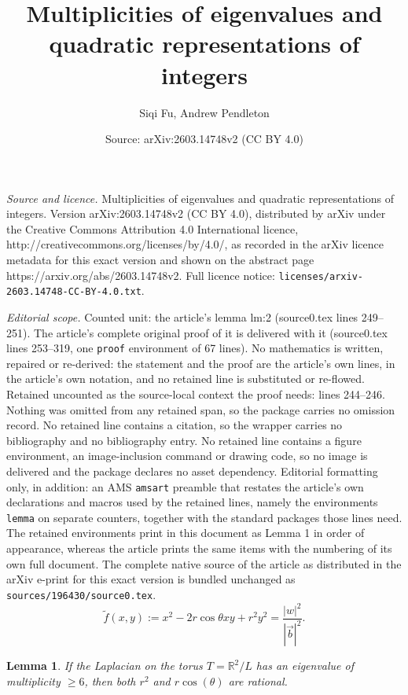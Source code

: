 \documentclass[10pt,a4paper]{amsart}
\title{Multiplicities of eigenvalues and quadratic representations of integers}
\author{Siqi Fu, Andrew Pendleton}
\date{Source: arXiv:2603.14748v2 (CC BY 4.0)}
\newtheorem{lemma}{Lemma}
\def\R{{\mathbb R}}
\begin{document}
\maketitle

\noindent\emph{Source and licence.} Multiplicities of eigenvalues and quadratic representations of integers. Version arXiv:2603.14748v2 (CC BY 4.0), distributed by arXiv under the Creative Commons Attribution 4.0 International licence, http://creativecommons.org/licenses/by/4.0/, as recorded in the arXiv licence metadata for this exact version and shown on the abstract page https://arxiv.org/abs/2603.14748v2. Full licence notice: \texttt{licenses/arxiv-2603.14748-CC-BY-4.0.txt}.\par\smallskip

\noindent\textit{Editorial scope.} Counted unit: the article's lemma lm:2 (source0.tex lines 249--251). The article's complete original proof of it is delivered with it (source0.tex lines 253--319, one \texttt{proof} environment of 67 lines). No mathematics is written, repaired or re-derived: the statement and the proof are the article's own lines, in the article's own notation, and no retained line is substituted or re-flowed.  Retained uncounted as the source-local context the proof needs: lines 244--246.  Nothing was omitted from any retained span, so the package carries no omission record.  No retained line contains a citation, so the wrapper carries no bibliography and no bibliography entry.  No retained line contains a figure environment, an image-inclusion command or drawing code, so no image is delivered and the package declares no asset dependency.  Editorial formatting only, in addition: an AMS \texttt{amsart} preamble that restates the article's own declarations and macros used by the retained lines, namely the environments \texttt{lemma} on separate counters, together with the standard packages those lines need.  The retained environments print in this document as Lemma 1 in order of appearance, whereas the article prints the same items with the numbering of its own full document.  The complete native source of the article as distributed in the arXiv e-print for this exact version is bundled unchanged as \texttt{sources/196430/source0.tex}.
\begin{equation}\label{eq:quadratic}
\tilde f(x, y):=x^2 - 2 r \cos \theta xy + r^2 y^2= \frac{|w|^2}{|\vec{b}|^2}.
\end{equation}

\begin{lemma}\label{lm:2}
	If the Laplacian on the torus  \( T=\R^2/L \) has an eigenvalue of multiplicity \( \geq 6 \), then both \( r^2 \) and \( r\cos(\theta) \) are rational.
\end{lemma}
\end{document}
